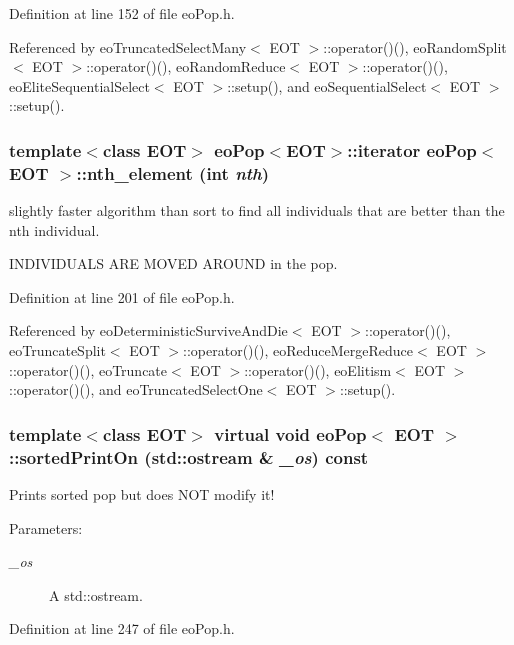 Definition at line 152 of file eo\-Pop.h.

Referenced by eo\-Truncated\-Select\-Many$<$ EOT $>$::operator()(), eo\-Random\-Split$<$ EOT $>$::operator()(), eo\-Random\-Reduce$<$ EOT $>$::operator()(), eo\-Elite\-Sequential\-Select$<$ EOT $>$::setup(), and eo\-Sequential\-Select$<$ EOT $>$::setup().
\subsubsection{\setlength{\rightskip}{0pt plus 5cm}template$<$class EOT$>$ {\bf eo\-Pop}$<${\bf EOT}$>$::iterator {\bf eo\-Pop}$<$ {\bf EOT} $>$::nth\_\-element (int {\em nth})\hspace{0.3cm}{\tt  [inline]}}\label{classeo_pop_a13}


slightly faster algorithm than sort to find all individuals that are better than the nth individual. 

INDIVIDUALS ARE MOVED AROUND in the pop. 

Definition at line 201 of file eo\-Pop.h.

Referenced by eo\-Deterministic\-Survive\-And\-Die$<$ EOT $>$::operator()(), eo\-Truncate\-Split$<$ EOT $>$::operator()(), eo\-Reduce\-Merge\-Reduce$<$ EOT $>$::operator()(), eo\-Truncate$<$ EOT $>$::operator()(), eo\-Elitism$<$ EOT $>$::operator()(), and eo\-Truncated\-Select\-One$<$ EOT $>$::setup().
\subsubsection{\setlength{\rightskip}{0pt plus 5cm}template$<$class EOT$>$ virtual void {\bf eo\-Pop}$<$ {\bf EOT} $>$::sorted\-Print\-On (std::ostream \& {\em \_\-os}) const\hspace{0.3cm}{\tt  [inline, virtual]}}\label{classeo_pop_a17}


Prints sorted pop but does NOT modify it! 

\begin{Desc}
\item[Parameters:]
\begin{description}
\item[{\em \_\-os}]A std::ostream. \end{description}
\end{Desc}


Definition at line 247 of file eo\-Pop.h.
